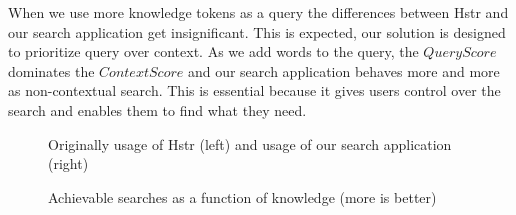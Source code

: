 When we use more knowledge tokens as a query the differences between Hstr and our search application get insignificant. This is expected, our solution is designed to prioritize query over context. As we add words to the query, the \(QueryScore\) dominates the \(ContextScore\) and our search application behaves more and more as non-contextual search. This is essential because it gives users control over the search and enables them to find what they need.

\begin{figure}[h!]
\centering
{}\hfill
{}
\caption{Achievable searches as a function of knowledge (more is better)}
\small{Originally usage of Hstr (left) and usage of our search application (right)}
\label{eval-metrics-plot-cmds}
\end{figure}

